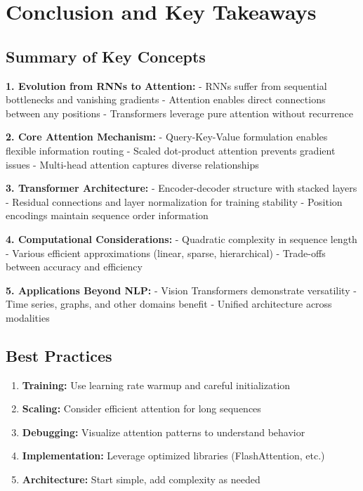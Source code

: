 

\section{Conclusion and Key Takeaways}

\subsection{Summary of Key Concepts}

\textbf{1. Evolution from RNNs to Attention:}
- RNNs suffer from sequential bottlenecks and vanishing gradients
- Attention enables direct connections between any positions
- Transformers leverage pure attention without recurrence

\textbf{2. Core Attention Mechanism:}
- Query-Key-Value formulation enables flexible information routing
- Scaled dot-product attention prevents gradient issues
- Multi-head attention captures diverse relationships

\textbf{3. Transformer Architecture:}
- Encoder-decoder structure with stacked layers
- Residual connections and layer normalization for training stability
- Position encodings maintain sequence order information

\textbf{4. Computational Considerations:}
- Quadratic complexity in sequence length
- Various efficient approximations (linear, sparse, hierarchical)
- Trade-offs between accuracy and efficiency

\textbf{5. Applications Beyond NLP:}
- Vision Transformers demonstrate versatility
- Time series, graphs, and other domains benefit
- Unified architecture across modalities

\subsection{Best Practices}

\begin{enumerate}
    \item \textbf{Training:} Use learning rate warmup and careful initialization
    \item \textbf{Scaling:} Consider efficient attention for long sequences
    \item \textbf{Debugging:} Visualize attention patterns to understand behavior
    \item \textbf{Implementation:} Leverage optimized libraries (FlashAttention, etc.)
    \item \textbf{Architecture:} Start simple, add complexity as needed
\end{enumerate}

